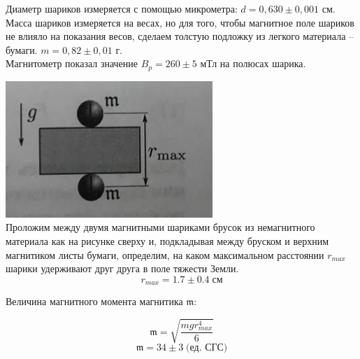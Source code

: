\documentclass[a4paper,12pt]{article}
\begin{document}
Диаметр шариков измеряется с помощью микрометра: $d = 0,630 \pm 0,001 $ см. \\
Масса шариков измеряется на весах, но для того, чтобы магнитное поле шариков не влияло на показания весов, сделаем толстую подложку из легкого материала -- бумаги. $m = 0,82 \pm 0,01 $ г. \\
Магнитометр показал значение $B_{p} = 260 \pm 5 $ мТл на полюсах шарика.
\begin{center}
\begin{minipage}{0.4\textwidth}
 \includegraphics[width=\linewidth]{1.jpg}\\
Проложим между двумя магнитными шариками брусок из немагнитного материала как на рисунке сверху и, подкладывая между бруском и верхним магнитиком листы бумаги, определим, на каком максимальном расстоянии $r_{max}$ шарики удерживают друг друга в поле тяжести Земли. \[r_{max} = 1.7 \pm 0.4 \; \text{см}\]

Величина магнитного момента магнитика $\mathfrak{m}$:

\[ \mathfrak{m} = \sqrt{\frac{mgr^4_{max}}{6}} \]
\[ \mathfrak{m} = 34 \pm 3 \; \text{(ед. СГС)} \]


\end{minipage}
\end{center}
\end{document}
